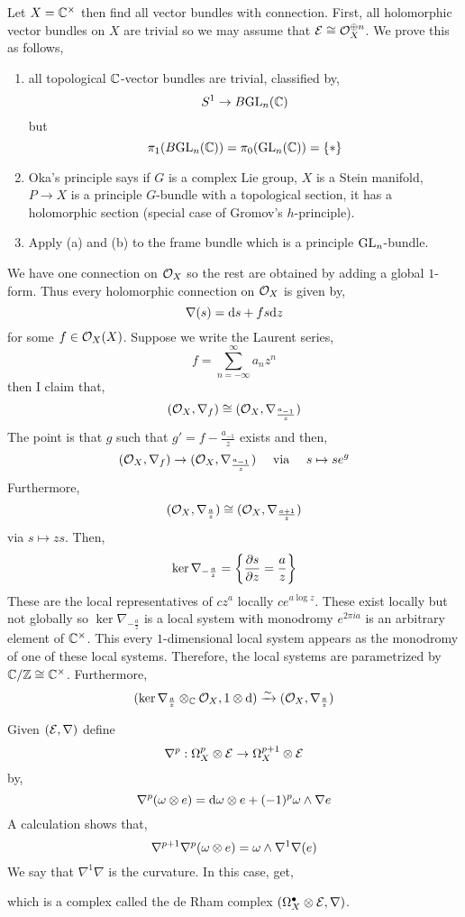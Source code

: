 \documentclass[12pt]{article}
\begin{document}
\begin{example}
Let $X = \mathbb{C}^\times$ then find all vector bundles with connection. First, all holomorphic vector bundles on $X$ are trivial so we may assume that $\mathcal{E} \cong \mathcal{O}_{X}^{\oplus n}$. We prove this as follows,
\begin{enumerate}
\item all topological $\mathbb{C}$-vector bundles are trivial, classified by,
\[ S^1 \to B \mathrm{GL}_n(\mathbb{C}) \]
but 
\[ \pi_1(B \mathrm{GL}_n(\mathbb{C})) = \pi_0(\mathrm{GL}_n(\mathbb{C})) = \{ * \} \]

\item Oka's principle says if $G$ is a complex Lie group, $X$ is a Stein manifold, $P \to X$ is a principle $G$-bundle with a topological section, it has a holomorphic section (special case of Gromov's $h$-principle). 

\item Apply (a) and (b) to the frame bundle which is a principle $\mathrm{GL}_n$-bundle. 
\end{enumerate}
We have one connection on $\mathcal{O}_{X}$ so the rest are obtained by adding a global $1$-form. Thus every holomorphic connection on $\mathcal{O}_{X}$ is given by,
\[ \nabla(s) = \mathrm{d}{s} + f s \mathrm{d}{z} \]
for some $f \in \mathcal{O}_{X}(X)$. Suppose we write the Laurent series,
\[ f = \sum_{n = - \infty}^{\infty} a_n z^n \]
then I claim that,
\[ (\mathcal{O}_{X}, \nabla_f) \cong (\mathcal{O}_{X}, \nabla_{\frac{a_{-1}}{z}}) \]
The point is that $g$ such that $g' = f - \frac{a_{-1}}{z}$ exists and then, 
\[ (\mathcal{O}_{X}, \nabla_f) \to (\mathcal{O}_{X}, \nabla_{\frac{a_{-1}}{z}}) \quad \text{ via } \quad  s \mapsto s e^{g} \]
Furthermore,
\[ (\mathcal{O}_{X}, \nabla_{\frac{a}{z}}) \cong (\mathcal{O}_{X}, \nabla_{\frac{a+1}{z}}) \]
via $s \mapsto zs$. Then,
\[ \ker{\nabla_{-\frac{a}{z}}} = \left\{ \frac{\partial{s}}{\partial{z}} = \frac{a}{z} \right \} \]
These are the local representatives of $c z^a$ locally $c e^{a \log{z}}$. These exist locally but not globally so $\ker{\nabla_{-\frac{a}{z}}}$ is a local system with monodromy $e^{2\pi i a}$ is an arbitrary element of $\mathbb{C}^\times$. This every $1$-dimensional local system appears as the monodromy of one of these local systems. Therefore, the local systems are parametrized by $\mathbb{C} / \mathbb{Z} \cong \mathbb{C}^\times$. Furthermore,
\[ (\ker{\nabla_{\frac{a}{z}}} \otimes_{\mathbb{C}} \mathcal{O}_{X}, 1 \otimes \mathrm{d}) \xrightarrow{\sim} (\mathcal{O}_{X}, \nabla_{\frac{a}{z}}) \]
\end{example}

\begin{defn}
Given $(\mathcal{E}, \nabla)$ define
\[ \nabla^p : \Omega^p_X \otimes \mathcal{E} \to \Omega^{p+1}_X \otimes \mathcal{E} \]
by,
\[ \nabla^p(\omega \otimes e) = \mathrm{d}{\omega} \otimes e + (-1)^p \omega \wedge \nabla e \]
A calculation shows that,
\[ \nabla^{p+1} \nabla^p(\omega \otimes e) = \omega \wedge \nabla^1 \nabla(e) \]
We say that $\nabla^1 \nabla$ is the curvature. In this case, get,
\begin{center}
\end{center}
which is a complex called the de Rham complex $(\Omega^\bullet_X \otimes \mathcal{E}, \nabla)$.
\end{defn}
\end{document}

